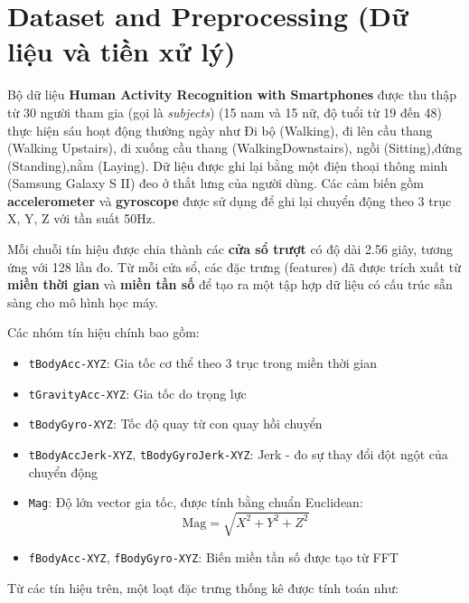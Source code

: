 \documentclass[
]{article}
\providecommand{\tightlist}{%
  \setlength{\itemsep}{0pt}\setlength{\parskip}{0pt}}
\begin{document}
\section{Dataset and Preprocessing (Dữ liệu và tiền xử
lý)}\label{dataset-and-preprocessing-dux1eef-liux1ec7u-vuxe0-tiux1ec1n-xux1eed-luxfd}

Bộ dữ liệu \textbf{Human Activity Recognition with Smartphones} được thu
thập từ 30 người tham gia (gọi là \emph{subjects}) (15 nam và 15 nữ, độ
tuổi từ 19 đến 48) thực hiện sáu hoạt động thường ngày như Đi bộ
(Walking), đi lên cầu thang (Walking Upstairs), đi xuống cầu thang
(WalkingDownstairs), ngồi (Sitting),đứng (Standing),nằm (Laying). Dữ
liệu được ghi lại bằng một điện thoại thông minh (Samsung Galaxy S II)
đeo ở thắt lưng của người dùng. Các cảm biến gồm \textbf{accelerometer}
và \textbf{gyroscope} được sử dụng để ghi lại chuyển động theo 3 trục X,
Y, Z với tần suất 50Hz.

Mỗi chuỗi tín hiệu được chia thành các \textbf{cửa sổ trượt} có độ dài
2.56 giây, tương ứng với 128 lần đo. Từ mỗi cửa sổ, các đặc trưng
(features) đã được trích xuất từ \textbf{miền thời gian} và \textbf{miền
tần số} để tạo ra một tập hợp dữ liệu có cấu trúc sẵn sàng cho mô hình
học máy.

Các nhóm tín hiệu chính bao gồm:

\begin{itemize}
\tightlist
\item
  \texttt{tBodyAcc-XYZ}: Gia tốc cơ thể theo 3 trục trong miền thời
  gian\\
\item
  \texttt{tGravityAcc-XYZ}: Gia tốc do trọng lực\\
\item
  \texttt{tBodyGyro-XYZ}: Tốc độ quay từ con quay hồi chuyển\\
\item
  \texttt{tBodyAccJerk-XYZ}, \texttt{tBodyGyroJerk-XYZ}: Jerk - đo sự
  thay đổi đột ngột của chuyển động\\
\item
  \texttt{Mag}: Độ lớn vector gia tốc, được tính bằng chuẩn Euclidean:\\
  \[
  \text{Mag} = \sqrt{X^2 + Y^2 + Z^2}
  \]
\item
  \texttt{fBodyAcc-XYZ}, \texttt{fBodyGyro-XYZ}: Biến miền tần số được
  tạo từ FFT
\end{itemize}

Từ các tín hiệu trên, một loạt đặc trưng thống kê được tính toán như:
\end{document}
